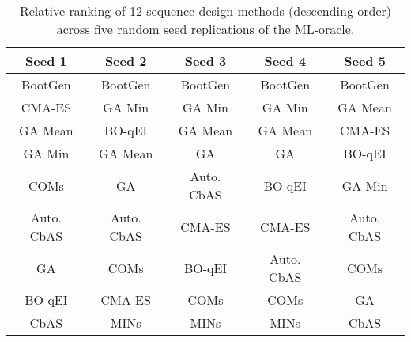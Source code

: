 \begin{table*}[t!]
  \caption{Relative ranking of 12 sequence design methods (descending order) across five random seed replications of the ML-oracle.}
  \vspace{1ex}
  \label{tab:gfp_seeds}
    \begin{minipage}{.48\textwidth}
      \centering
      \begin{adjustbox}{width=\linewidth,center}
      \begin{tabular}{|c|c|c|c|c|}
        \toprule
            \textbf{Seed 1}                                           & \textbf{Seed 2}                                        & \textbf{Seed 3}                                          & \textbf{Seed 4}                    & \textbf{Seed 5}                                        \\ \midrule 
            \cellcolor[HTML]{E6B8AF}BootGen & \cellcolor[HTML]{E6B8AF}BootGen & \cellcolor[HTML]{E6B8AF}BootGen & \cellcolor[HTML]{E6B8AF}BootGen & \cellcolor[HTML]{E6B8AF}BootGen \\ 
\cellcolor[HTML]{EAD1DC}CMA-ES & \cellcolor[HTML]{CFE2F3}GA Min & \cellcolor[HTML]{CFE2F3}GA Min & \cellcolor[HTML]{CFE2F3}GA Min & \cellcolor[HTML]{F4CCCC}GA Mean  \\ 
\cellcolor[HTML]{F4CCCC}GA Mean  & \cellcolor[HTML]{B5DDCA}BO-qEI & \cellcolor[HTML]{F4CCCC}GA Mean  & \cellcolor[HTML]{F4CCCC}GA Mean  & \cellcolor[HTML]{EAD1DC}CMA-ES \\ 
\cellcolor[HTML]{CFE2F3}GA Min & \cellcolor[HTML]{F4CCCC}GA Mean  & \cellcolor[HTML]{D9D2E9}GA & \cellcolor[HTML]{D9D2E9}GA & \cellcolor[HTML]{B5DDCA}BO-qEI \\ 
\cellcolor[HTML]{C9DAF8}COMs  & \cellcolor[HTML]{D9D2E9}GA & \cellcolor[HTML]{D9EAD3}Auto. CbAS & \cellcolor[HTML]{B5DDCA}BO-qEI & \cellcolor[HTML]{CFE2F3}GA Min \\ 
\cellcolor[HTML]{D9EAD3}Auto. CbAS & \cellcolor[HTML]{D9EAD3}Auto. CbAS & \cellcolor[HTML]{EAD1DC}CMA-ES & \cellcolor[HTML]{EAD1DC}CMA-ES & \cellcolor[HTML]{D9EAD3}Auto. CbAS \\ 
\cellcolor[HTML]{D9D2E9}GA & \cellcolor[HTML]{C9DAF8}COMs  & \cellcolor[HTML]{B5DDCA}BO-qEI & \cellcolor[HTML]{D9EAD3}Auto. CbAS & \cellcolor[HTML]{C9DAF8}COMs  \\ 
\cellcolor[HTML]{B5DDCA}BO-qEI & \cellcolor[HTML]{EAD1DC}CMA-ES & \cellcolor[HTML]{C9DAF8}COMs  & \cellcolor[HTML]{C9DAF8}COMs  & \cellcolor[HTML]{D9D2E9}GA \\ 
\cellcolor[HTML]{FCE5CD}CbAS & \cellcolor[HTML]{D0E0E3}MINs & \cellcolor[HTML]{D0E0E3}MINs & \cellcolor[HTML]{D0E0E3}MINs & \cellcolor[HTML]{FCE5CD}CbAS \\ 

\end{tabular}
\end{adjustbox}
\end{minipage}
\end{table*}
